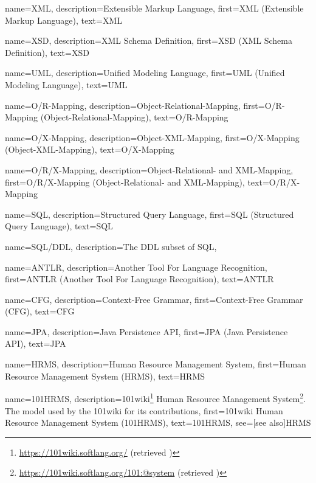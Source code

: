 {
    name=XML,
    description={Extensible Markup Language},
    first={XML (Extensible Markup Language)},
    text={XML}
}

{
    name=XSD,
    description={XML Schema Definition},
    first={XSD (XML Schema Definition)},
    text={XSD}
}

{
    name=UML,
    description={Unified Modeling Language},
    first={UML (Unified Modeling Language)},
    text={UML}
}

{
    name=O/R-Mapping,
    description={Object-Relational-Mapping},
    first={O/R-Mapping (Object-Relational-Mapping)},
    text={O/R-Mapping}
}

{
    name=O/X-Mapping,
    description={Object-XML-Mapping},
    first={O/X-Mapping (Object-XML-Mapping)},
    text={O/X-Mapping}
}

{
    name=O/R/X-Mapping,
    description={Object-Relational- and XML-Mapping},
    first={O/R/X-Mapping (Object-Relational- and XML-Mapping)},
    text={O/R/X-Mapping}
}

{
    name=SQL,
    description={Structured Query Language},
    first={SQL (Structured Query Language)},
    text={SQL}
}

{
    name=SQL/DDL,
    description={The DDL subset of SQL},
}

{
    name=ANTLR,
    description={Another Tool For Language Recognition},
    first={ANTLR (Another Tool For Language Recognition)},
    text={ANTLR}
}

{
    name=CFG,
    description={Context-Free Grammar},
    first={Context-Free Grammar (CFG)},
    text={CFG}
}

{
    name=JPA,
    description={Java Persistence API},
    first={JPA (Java Persistence API)},
    text={JPA}
}

{
    name=HRMS,
    description={Human Resource Management System},
    first={Human Resource Management System (HRMS)},
    text={HRMS}
}

{
    name=101HRMS,
    description={101wiki\footnote{\url{https://101wiki.softlang.org/} (retrieved )} Human Resource Management System\footnote{\url{https://101wiki.softlang.org/101:@system} (retrieved )}. The model used by the 101wiki for its contributions},
    first={101wiki Human Resource Management System (101HRMS)},
    text={101HRMS},
    see=[see also]{HRMS}
}

